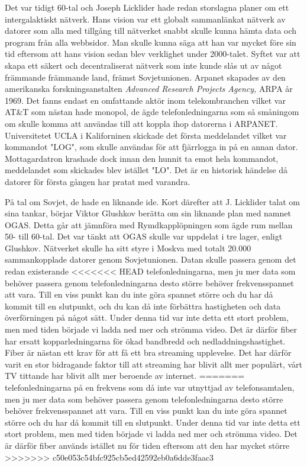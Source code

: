 \documentclass[a4paper,11pt]{article}
\begin{document}
Det var tidigt 60-tal och Joseph Licklider hade redan storslagna planer om ett
intergalaktiskt nätverk. Hans vision var ett globalt sammanlänkat nätverk av
datorer som alla med tillgång till nätverket snabbt skulle kunna hämta data och
program från alla webbsidor. Man skulle kunna säga att han var mycket före sin
tid eftersom att hans vision sedan blev verklighet under 2000-talet. Syftet var
att skapa ett säkert och decentraliserat nätverk som inte kunde slås ut av något
främmande främmande land, främst Sovjetunionen. Arpanet skapades av den
amerikanska forskningsanstalten \textit{Advanced Research Projects Agency,} ARPA
år 1969. Det fanns endast en omfattande aktör inom telekombranchen vilket var
AT\&T som nästan hade monopol, de ägde telefonledningarna som så småningom om
skulle komma att användas till att koppla ihop datorerna i ARPANET.
Universitetet UCLA i Kaliforninen skickade det första meddelandet vilket var
kommandot "LOG", som skulle användas för att fjärrlogga in på en annan dator.
Mottagardatron krashade dock innan den hunnit ta emot hela kommandot,
meddelandet som skickades blev istället "LO". Det är en historisk händelse då
datorer för första gången har pratat med varandra.

På tal om Sovjet, de hade en liknande ide. Kort därefter att J. Licklider talat
om sina tankar, börjar Viktor Glushkov berätta om sin liknande plan med namnet
OGAS. Detta går att jämnföra med Rymdkapplöpningen som ägde rum mellan 50- till
60-tal. Det var tänkt att OGAS skulle var uppdelat i tre lager, enligt Glushkov.
Nätverket skulle ha sitt styre i Moskva med totalt 20.000 sammankopplade datorer
genom Sovjetunionen. Datan skulle passera genom det redan existerande
<<<<<<< HEAD
telefonledningarna, men ju mer data som behöver passera genom telefonledningarna
desto större behöver frekvensspannet att vara. Till en viss punkt kan du inte
göra spannet större och du har då kommit till en slutpunkt, och du kan då inte
förbättra hastigheten och data överförningen på något sätt. Under denna tid var
inte detta ett stort problem, men med tiden började vi ladda ned mer och strömma
video. Det är därför fiber har ersatt kopparledningarna för ökad bandbredd och
nedladdningshastighet. Fiber är nästan ett krav för att få ett bra streaming
upplevelse. Det har därför varit en stor bidragande faktor till att streaming
har blivit allt mer populärt, vårt TV tittande har blivit allt mer beroende av
internet.
=======
telefonledningarna på en frekvens som då inte var utnyttjad av telefonsamtalen,
men ju mer data som behöver passera genom telefonledningarna desto större
behöver frekvensspannet att vara. Till en viss punkt kan du inte göra spannet
större och du har då kommit till en slutpunkt. Under denna tid var inte detta
ett stort problem, men med tiden började vi ladda ned mer och strömma video. Det
är därför fiber används istället nu för tiden eftersom att den har mycket större
>>>>>>> c50e053c54bfc925cb5ed42592eb0a6dde3faac3
\end{document}
